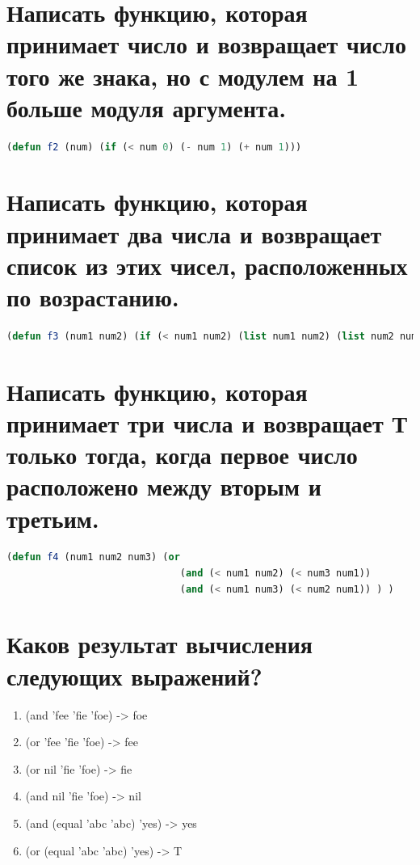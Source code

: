 \documentclass[12pt]{report}
\begin{document}
\section{Написать функцию, которая принимает число и возвращает число
того же знака, но с модулем на 1 больше модуля аргумента.}

\begin{lstlisting}[language=Lisp]
(defun f2 (num) (if (< num 0) (- num 1) (+ num 1)))
\end{lstlisting}
 

\section{Написать функцию, которая принимает два числа и возвращает
список из этих чисел, расположенных по возрастанию.}

\begin{lstlisting}[language=Lisp]
(defun f3 (num1 num2) (if (< num1 num2) (list num1 num2) (list num2 num1)))
\end{lstlisting}


\section{Написать функцию, которая принимает три числа и возвращает Т только
тогда, когда первое число расположено между вторым и третьим.} 

\begin{lstlisting}[language=Lisp]
(defun f4 (num1 num2 num3) (or 
                              (and (< num1 num2) (< num3 num1)) 
                              (and (< num1 num3) (< num2 num1)) ) )
\end{lstlisting}


\section{Каков результат вычисления следующих выражений?}

\begin{enumerate}
    \item (and 'fee 'fie 'foe) -> foe
    \item (or 'fee 'fie 'foe) -> fee
    \item (or nil 'fie 'foe) -> fie
    \item (and nil 'fie 'foe) -> nil
    \item (and (equal 'abc 'abc) 'yes) -> yes
    \item (or (equal 'abc 'abc) 'yes) -> T

\end{enumerate}
\end{document}
